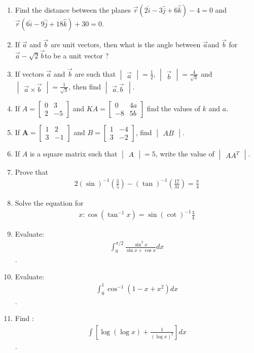 \documentclass[12pt,-letter paper]{article}
\let\vec\mathbf{}
\let\vec\mathbf{}
\let\vec\mathbf{}
\providecommand{\mydet}[1]{\ensuremath{\begin{vmatrix}#1\end{vmatrix}}}
\providecommand{\myvec}[1]{\ensuremath{\begin{bmatrix}#1\end{bmatrix}}}
\begin{document}
\begin{enumerate}
\item Find the distance between the planes $\overset{\rightarrow}{r}(2\hat{i}-3\hat{j}+6\hat{k})-4= 0$ and $\overset{\rightarrow}{r}(6\hat{i}-9\hat{j}+18\hat{k})+30=0$.
\item If $\overset{\rightarrow}{a}$ and $\overset{\rightarrow}{b}$ are unit vectors, then what is the angle between $\overset{\rightarrow}{a}$and $\overset{\rightarrow}{b}$ for $\overset{\rightarrow}{a}-\sqrt{2}  \overset{\rightarrow}{b}$to be a unit vector ?
\item If vectors $\overset{\rightarrow}{a}$ and $\overset{\rightarrow}{b}$ are such that $\mydet{\overset{\rightarrow}{a}}=\frac{1}{2}$, $\mydet{\overset{\rightarrow}{b}}=\frac{4}{\sqrt{3}}$ and $\mydet{\overset{\rightarrow}{a} \times \overset{\rightarrow}{b}}=\frac{1}{\sqrt{3}}$, then find $\mydet{\overset{\rightarrow}{a}.\overset{\rightarrow}{b}}$.
\item If $A=\myvec{0 & 3 \\ 2 & -5}$ and $KA=\myvec{0 & 4a \\ 
 -8 & 5b }$ find the values of $k$ and $a$.
\item If $\vec{A}=\myvec{1 & 2 \\ 3 & -1}$ and  $B = \myvec {1 & -4 \\ 3 & -2 }$, find $\mydet{AB}$.
\item If $A$ is a square matrix such that $\mydet{A}=5$, write the value of $\mydet{AA^T}$.
\item Prove that 
	\begin{align*} 2(\sin)^{-1} (\frac{3}{5})-(\tan)^{-1}(\frac{17}{31})=\frac{\pi}{4} 
	\end{align*}
\item Solve the equation for \begin{align*}x:\cos(\tan^{-1} x)=\sin(\cot)^{-1}\frac{3}{4}\end{align*}
\item Evaluate: \begin{align*}\int_{0}^{\pi/2} \frac{\sin^2{x}}{\sin{x} + \cos{x}}dx\end{align*}.
	\item Evaluate: \begin{align*}\int_{0}^{1} \cos^{-1}(1-x+x^2)dx \end{align*}.
\item Find : \begin{align*}\int[\log(\log{x})+\frac{1}{(\log{x})^2}]dx\end{align*}.

\end{enumerate}
\end{document}

